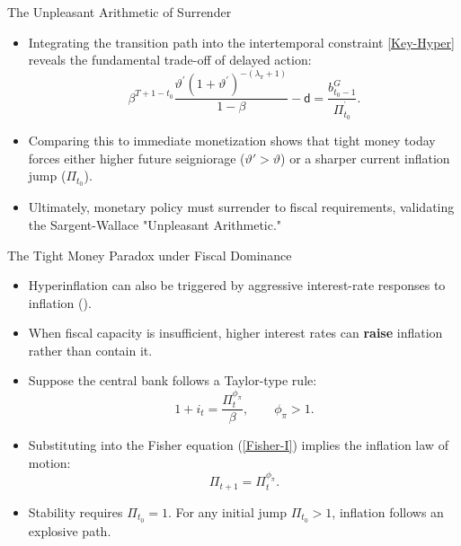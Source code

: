 \documentclass[11pt,aspectratio=169]{beamer}
\begin{document}
\begin{frame}{The Unpleasant Arithmetic of Surrender}
\small


\begin{itemize}
\item Integrating the transition path into the intertemporal constraint \eqref{Key-Hyper} reveals the fundamental trade-off of delayed action:
    \begin{equation}
    \beta ^{T+1-t_{0}}\frac{\vartheta ^{\prime }(1+\vartheta ^{\prime })^{-(\lambda _{\pi }+1)}}{1-\beta }-\mathsf{d}=\frac{b_{t_{0}-1}^{G}}{\Pi _{t_{0}}^{^{\prime }}}. \label{EqI2}
    \end{equation}
    \item Comparing this to immediate monetization shows that tight money today forces either higher future seigniorage ($\vartheta' > \vartheta$) or a sharper current inflation jump ($\Pi_{t_0}$).
    \item Ultimately, monetary policy must surrender to fiscal requirements, validating the Sargent-Wallace "Unpleasant Arithmetic."
\end{itemize}
\end{frame}

\begin{frame}{The Tight Money Paradox under Fiscal Dominance}
\small
\begin{itemize}
    \item Hyperinflation can also be triggered by aggressive interest-rate responses to inflation (\cite{loyo1999}).
    \item When fiscal capacity is insufficient, higher interest rates can \textbf{raise} inflation rather than contain it.
    \item Suppose the central bank follows a Taylor-type rule:
    \[
        1+i_{t} = \frac{\Pi_{t}^{\phi_{\pi}}}{\beta},
        \qquad \phi_{\pi}>1.
    \]
    \item Substituting into the Fisher equation (\ref{Fisher-I}) implies the inflation law of motion:
    \begin{equation}
        \Pi_{t+1} = \Pi_{t}^{\phi_{\pi}}.
        \label{Tight-2-bis}
    \end{equation}
    \item Stability requires \(\Pi_{t_0}=1\). For any initial jump \(\Pi_{t_0}>1\), inflation follows an explosive path.
\end{itemize}
\end{frame}
\end{document}
